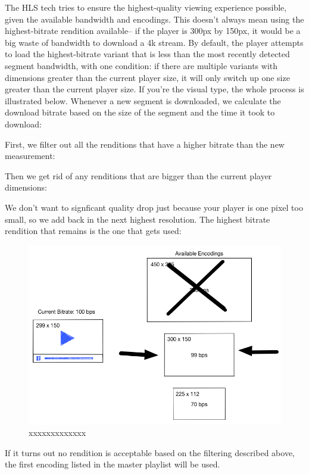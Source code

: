 The HLS tech tries to ensure the highest-quality viewing experience possible, given the available bandwidth and encodings. This doesn't always mean using the highest-bitrate rendition available-- if the player is 300px by 150px, it would be a big waste of bandwidth to download a 4k stream. By default, the player attempts to load the highest-bitrate variant that is less than the most recently detected segment bandwidth, with one condition: if there are multiple variants with dimensions greater than the current player size, it will only switch up one size greater than the current player size.
If you're the visual type, the whole process is illustrated below. Whenever a new segment is downloaded, we calculate the download bitrate based on the size of the segment and the time it took to download:



First, we filter out all the renditions that have a higher bitrate than the new measurement:



Then we get rid of any renditions that are bigger than the current player dimensions:




We don't want to signficant quality drop just because your player is one pixel too small, so we add back in the next highest resolution. The highest bitrate rendition that remains is the one that gets used:


\begin{figure}[htb] %
 \centering
 \includegraphics[width=1.0\linewidth]{images/chapter2/bitrate-switching-4.png}\hfill
 \caption[xxxxxxxxx]{xxxxxxxxxxxxx}
 \label{fig:fourV}
\end{figure}


If it turns out no rendition is acceptable based on the filtering described above, the first encoding listed in the master playlist will be used.


\newpage
